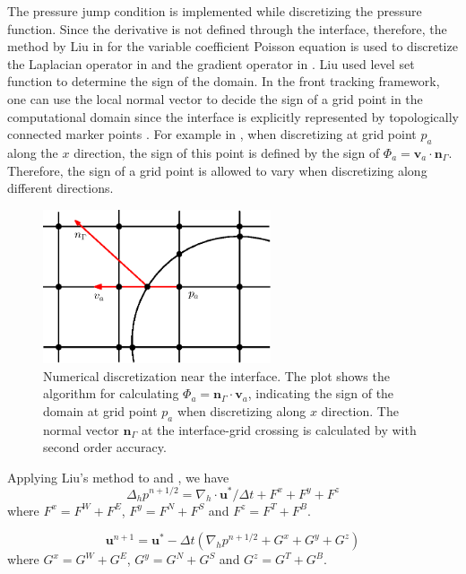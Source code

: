 The pressure jump condition is implemented while discretizing the pressure
function. Since the derivative is not defined through the interface, therefore,
the method by Liu in \cite{liu2000boundary} for the variable coefficient
Poisson equation is used to discretize the Laplacian operator in  and
the gradient operator in .  Liu used level set function
\cite{osher1988fronts} to determine the sign of the domain. In the front
tracking framework, one can use the local normal vector to decide the sign of a
grid point in the computational domain since the interface is explicitly
represented by topologically connected marker points \cite{GliGroLi98}.  For
example in , when discretizing at grid point $p_a$ along the $x$
direction, the sign of this point is defined by the sign of $\Phi_a =
\mathbf{v}_a\cdot \mathbf{n}_{\Gamma}$.  Therefore, the sign of a grid point is
allowed to vary when discretizing along different directions.

\begin{figure}[] \centering
\includegraphics[width=0.6\textwidth]{Figures/grid.eps}
\caption{Numerical discretization near the interface. The plot
shows the algorithm for calculating
$\Phi_a = \mathbf{n}_\Gamma\cdot \mathbf{v}_a$, indicating the sign of the
domain at grid point $p_a$ when discretizing along $x$ direction. The normal
vector $\mathbf{n}_\Gamma$ at the interface-grid crossing is calculated by
\FronTierp with second order accuracy.}
\label{grid}
\end{figure}

Applying Liu's method to  and , we have
\begin{equation} \Delta_h p^{n+1/2}
= \nabla_h\cdot \mathbf{u}^*/\Delta t + F^x + F^y + F^z \label{newLap}
\end{equation} where $F^x = F^W + F^E$, $F^y = F^N + F^S$ and $F^z = F^T + F^B$.

\begin{equation} \label{newGrad} \mathbf{u}^{n+1} = \mathbf{u}^* - \Delta
t(\nabla_h p^{n+1/2} + G^x + G^y + G^z) \end{equation} where $G^x = G^W + G^E$,
$G^y = G^N + G^S$ and $G^z = G^T + G^B$.

